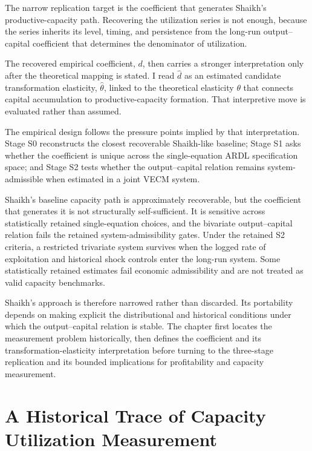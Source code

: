 \documentclass[11pt]{article}
\begin{document}
The narrow replication target is the coefficient that generates Shaikh's productive-capacity path. Recovering the utilization series is not enough, because the series inherits its level, timing, and persistence from the long-run output--capital coefficient that determines the denominator of utilization.

The recovered empirical coefficient, $d$, then carries a stronger interpretation only after the theoretical mapping is stated. I read $\hat{d}$ as an estimated candidate transformation elasticity, $\hat{\theta}$, linked to the theoretical elasticity $\theta$ that connects capital accumulation to productive-capacity formation. That interpretive move is evaluated rather than assumed.

The empirical design follows the pressure points implied by that interpretation. Stage S0 reconstructs the closest recoverable Shaikh-like baseline; Stage S1 asks whether the coefficient is unique across the single-equation ARDL specification space; and Stage S2 tests whether the output--capital relation remains system-admissible when estimated in a joint VECM system.

Shaikh's baseline capacity path is approximately recoverable, but the coefficient that generates it is not structurally self-sufficient. It is sensitive across statistically retained single-equation choices, and the bivariate output--capital relation fails the retained system-admissibility gates. Under the retained S2 criteria, a restricted trivariate system survives when the logged rate of exploitation and historical shock controls enter the long-run system. Some statistically retained estimates fail economic admissibility and are not treated as valid capacity benchmarks.

Shaikh's approach is therefore narrowed rather than discarded. Its portability depends on making explicit the distributional and historical conditions under which the output--capital relation is stable. The chapter first locates the measurement problem historically, then defines the coefficient and its transformation-elasticity interpretation before turning to the three-stage replication and its bounded implications for profitability and capacity measurement.

\section{A Historical Trace of Capacity Utilization Measurement}
\label{sec:literature_review}
\end{document}
